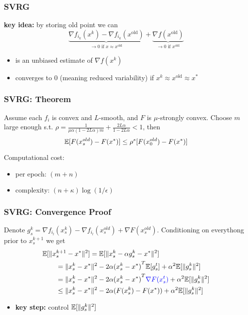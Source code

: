 \documentclass[aspectratio=149]{beamer}
\begin{document}
\begin{frame}
  \frametitle{SVRG}
  \textbf{key idea:} by storing old point we can
  \begin{equation}
    \underbrace{\nabla f_{i_k}(x^k) - \nabla f_{i_k}(x^{\text{old}})}_{\text{$\to 0$ if $x\approx x^{\text{old}}$}} + \underbrace{\nabla f(x^{\text{old}})}_{\text{$\to 0$ if $x^{\text{old}}$}}
  \end{equation}
  \begin{itemize}
    \item is an unbiased estimate of $\nabla f(x^k)$
    \item converges to $0$ (meaning reduced variability) if $x^k\approx x^{\text{old}} \approx x^*$
  \end{itemize}

\end{frame}

\begin{frame}
  \frametitle{SVRG: Theorem}

  \begin{theorem}
    Assume each $f_i$ is convex and $L$-smooth, and $F$ is $\mu$-strongly convex.
    Choose $m$ large enough s.t. $\rho = \frac{1}{\mu \alpha (1-2L \alpha)m} + \frac{2L \alpha}{1-2L \alpha}< 1$, then
    \begin{equation}
      \mathbb{E}[F(x_s^{old})- F(x^*)] \le \rho^s [F(x_0^{old})-F(x^*)]
    \end{equation}
  \end{theorem}
  Computational cost:
  \begin{itemize}
    \item per epoch: $(m+n)$
    \item complexity: $(n+ \kappa) \log(1/\epsilon)$
  \end{itemize}
\end{frame}

\begin{frame}
  \frametitle{SVRG: Convergence Proof}
  Denote $g_s^k = \nabla f_{i_l}(x_s^k) - \nabla f_{i_l}(x_s^{old}) + \nabla F(x_s^{old})$. Conditioning on everythong prior to $x_s^{k+1}$ we get
  \begin{equation}
    \begin{aligned}
      \MoveEqLeft \E [\Vert x_s^{k+1} - x^* \Vert^2] = \E [\Vert x_s^{k}- \alpha g_s^k - x^* \Vert^2] \\
      &= \Vert x_s^k-x^* \Vert^2 - 2 \alpha {(x_s^k-x^* )}^T \E[g_s^t] + \alpha^2 \E[\Vert g_s^k \Vert^2] \\
      &= \Vert x_s^k-x^* \Vert^2 - 2 \alpha {(x_s^k-x^* )}^T \textcolor{blue}{\nabla F(x_s^t)} + \alpha^2 \E[\Vert g_s^k \Vert^2] \\
      &\le \Vert x_s^k-x^* \Vert^2 - 2 \alpha (F(x_s^k) - F(x^*))+ \alpha^2 \E[\Vert g_s^k \Vert^2]
    \end{aligned}
  \end{equation}

  \begin{itemize}
     \item \textbf{key step:} control $\mathbb{E}[\Vert g_s^k \Vert^2]$
   \end{itemize}
\end{frame}
\end{document}
